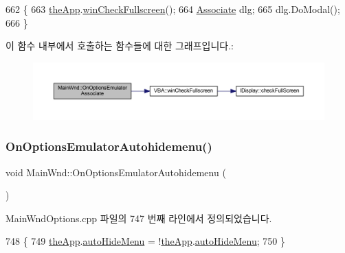 \begin{DoxyCode}
662 \{
663   \mbox{\hyperlink{_v_b_a_8cpp_a8095a9d06b37a7efe3723f3218ad8fb3}{theApp}}.\mbox{\hyperlink{class_v_b_a_a340eaeeb7fcfc242f08ac3442d991a96}{winCheckFullscreen}}();
664   \mbox{\hyperlink{class_associate}{Associate}} dlg;
665   dlg.DoModal();
666 \}
\end{DoxyCode}
이 함수 내부에서 호출하는 함수들에 대한 그래프입니다.\+:
\nopagebreak
\begin{figure}[H]
\begin{center}
\leavevmode
\includegraphics[width=350pt]{class_main_wnd_a824b678e28dacab4a43b4ac0918e8555_cgraph}
\end{center}
\end{figure}
\mbox{\label{class_main_wnd_aad0ef218c2640f431c99fa522c2b3518}} 
\subsubsection{\texorpdfstring{On\+Options\+Emulator\+Autohidemenu()}{OnOptionsEmulatorAutohidemenu()}}
{\footnotesize\ttfamily void Main\+Wnd\+::\+On\+Options\+Emulator\+Autohidemenu (\begin{DoxyParamCaption}{ }\end{DoxyParamCaption})\hspace{0.3cm}{\ttfamily [protected]}}



Main\+Wnd\+Options.\+cpp 파일의 747 번째 라인에서 정의되었습니다.


\begin{DoxyCode}
748 \{
749   \mbox{\hyperlink{_v_b_a_8cpp_a8095a9d06b37a7efe3723f3218ad8fb3}{theApp}}.\mbox{\hyperlink{class_v_b_a_a19362d5508f73c0f93f307eef61d6915}{autoHideMenu}} = !\mbox{\hyperlink{_v_b_a_8cpp_a8095a9d06b37a7efe3723f3218ad8fb3}{theApp}}.\mbox{\hyperlink{class_v_b_a_a19362d5508f73c0f93f307eef61d6915}{autoHideMenu}};
750 \}
\end{DoxyCode}
\mbox{\label{class_main_wnd_a346906f834cf5c654550dafab20e864c}} 
